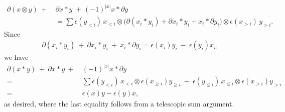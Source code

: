 \begin{align*}
\partial (x \otimes y) \ +\ & \partial x \ast y\ +\, (-1)^{|x|}x \ast \partial y \\
& = \sum \epsilon(y_{<i})\, x_{<i} \otimes \big(\partial(x_i \ast y_i) + \partial x_i \ast y_i + x_i \ast \partial y_i\big) \otimes \epsilon(x_{>i})\, y_{>i}.
\end{align*}
Since
\begin{align*}
\partial(x_i \ast y_i)\ +\ \partial x_i \ast y_i\ +\ x_i \ast \partial y_i =
\epsilon(x_i)y_i\ -\ \epsilon(y_i)x_i,
\end{align*}
we have
\begin{align*}
\partial (x \ast y) \ +\ \partial x \ast y\ +\ & (-1)^{|x|}x \ast \partial y \\ = \ &
\sum \epsilon(y_{<i}) \, x_{<i} \otimes \epsilon(x_{\geq i}) y_{\geq i}\ -\
\epsilon(y_{\leq i}) \, x_{\leq i} \otimes \epsilon(x_{>i}) y_{>i} \\ = \ &
\epsilon(x)y - \epsilon(y)x,
\end{align*}
as desired, where the last equality follows from a telescopic sum argument.